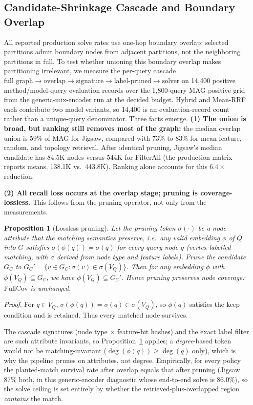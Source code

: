 \documentclass{article}
\newtheorem{proposition}{Proposition}
\begin{document}
\subsection{Candidate-Shrinkage Cascade and Boundary Overlap}
\label{sec:shrinkage}

All reported production solve rates use one-hop boundary overlap: selected partitions admit boundary nodes from adjacent partitions, not the neighboring partitions in full. To test whether unioning this boundary overlap makes partitioning irrelevant, we measure the per-query cascade $\text{full graph} \to \text{overlap} \to \text{signature} \to \text{label-pruned} \to \text{solver}$ on 14{,}400 positive method/model-query evaluation records over the 1{,}800-query MAG positive grid from the generic-mix-encoder run at the decided budget. Hybrid and Mean-RRF each contribute two model variants, so 14{,}400 is an evaluation-record count rather than a unique-query denominator. Three facts emerge. \textbf{(1) The union is broad, but ranking still removes most of the graph:} the median overlap union is 59\% of MAG for Jigsaw, compared with 73\% to 83\% for mean-feature, random, and topology retrieval. After identical pruning, Jigsaw's median candidate has 84.5K nodes versus 544K for FilterAll (the production matrix reports means, 138.1K vs.\ 443.8K). Ranking alone accounts for this $6.4\times$ reduction.

\textbf{(2) All recall loss occurs at the overlap stage; pruning is coverage-lossless.} This follows from the pruning operator, not only from the measurements.

\begin{proposition}[Lossless pruning]
\label{prop:lossless}
Let the pruning token $\sigma(\cdot)$ be a node attribute that the matching semantics preserve, i.e.\ any valid embedding $\phi$ of $Q$ into $G$ satisfies $\sigma(\phi(q))=\sigma(q)$ for every query node $q$ (vertex-labelled matching, with $\sigma$ derived from node type and feature labels). Prune the candidate $G_C$ to $G_C'=\{v\in G_C : \sigma(v)\in \sigma(V_Q)\}$. Then for any embedding $\phi$ with $\phi(V_Q)\subseteq G_C$, we have $\phi(V_Q)\subseteq G_C'$. Hence pruning preserves node coverage: $\mathrm{FullCov}$ is unchanged.
\end{proposition}
\noindent\emph{Proof.} For $q\in V_Q$, $\sigma(\phi(q))=\sigma(q)\in\sigma(V_Q)$, so $\phi(q)$ satisfies the keep condition and is retained. Thus every matched node survives.

The cascade signatures (node type $\times$ feature-bit hashes) and the exact label filter are such attribute invariants, so Proposition~\ref{prop:lossless} applies; a \emph{degree}-based token would not be matching-invariant ($\deg(\phi(q))\ge\deg(q)$ only), which is why the pipeline prunes on attributes, not degree. Empirically, for every policy the planted-match survival rate after overlap equals that after pruning (Jigsaw $87\%$ both, in this generic-encoder diagnostic whose end-to-end solve is $86.0\%$), so the solve ceiling is set entirely by whether the retrieved-plus-overlapped region \emph{contains} the match.
\end{document}
